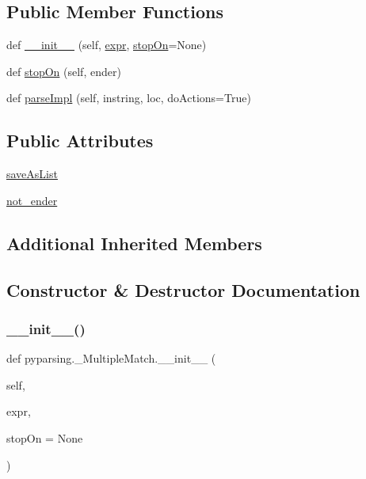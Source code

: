 \subsection*{Public Member Functions}
\begin{DoxyCompactItemize}
\item 
def \hyperlink{classpyparsing_1_1__MultipleMatch_ad81ae06fdbcdb17176f3d154382ce1ca}{\+\_\+\+\_\+init\+\_\+\+\_\+} (self, \hyperlink{classpyparsing_1_1ParseElementEnhance_a0139048279aeac38804a10d131d3c340}{expr}, \hyperlink{classpyparsing_1_1__MultipleMatch_aae02df8892bd80aec4ffe8cee4def728}{stop\+On}=None)
\item 
def \hyperlink{classpyparsing_1_1__MultipleMatch_aae02df8892bd80aec4ffe8cee4def728}{stop\+On} (self, ender)
\item 
def \hyperlink{classpyparsing_1_1__MultipleMatch_a644ff50535654663aef64b4b8316a4d3}{parse\+Impl} (self, instring, loc, do\+Actions=True)
\end{DoxyCompactItemize}
\subsection*{Public Attributes}
\begin{DoxyCompactItemize}
\item 
\hyperlink{classpyparsing_1_1__MultipleMatch_adc807675178ada8ed40333dbe98a5a1e}{save\+As\+List}
\item 
\hyperlink{classpyparsing_1_1__MultipleMatch_a7db748ce7c3eea9f6b70cb0db8762481}{not\+\_\+ender}
\end{DoxyCompactItemize}
\subsection*{Additional Inherited Members}


\subsection{Constructor \& Destructor Documentation}
\mbox{\label{classpyparsing_1_1__MultipleMatch_ad81ae06fdbcdb17176f3d154382ce1ca}} 
\subsubsection{\texorpdfstring{\+\_\+\+\_\+init\+\_\+\+\_\+()}{\_\_init\_\_()}}
{\footnotesize\ttfamily def pyparsing.\+\_\+\+Multiple\+Match.\+\_\+\+\_\+init\+\_\+\+\_\+ (\begin{DoxyParamCaption}\item[{}]{self,  }\item[{}]{expr,  }\item[{}]{stop\+On = {\ttfamily None} }\end{DoxyParamCaption})}



